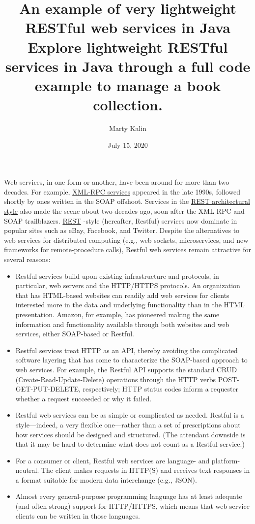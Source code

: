 \documentclass[12pt]{article}
\title{%
    An example of very lightweight RESTful web services in Java
    \large Explore lightweight RESTful services in Java through a full code example to manage a book collection.}
\author{Marty Kalin}
\date{July 15, 2020}
\begin{document}
\maketitle

\newpage

Web services, in one form or another, have been around for more than two decades. For example, \href{http://xmlrpc.com/}{XML-RPC services} appeared in the late 1990s, followed shortly by ones written in the SOAP offshoot. Services in the \href{https://en.wikipedia.org/wiki/Representational_state_transfer}{REST architectural style} also made the scene about two decades ago, soon after the XML-RPC and SOAP trailblazers. \href{https://www.redhat.com/en/topics/integration/whats-the-difference-between-soap-rest}{REST} -style (hereafter, Restful) services now dominate in popular sites such as eBay, Facebook, and Twitter. Despite the alternatives to web services for distributed computing (e.g., web sockets, microservices, and new frameworks for remote-procedure calls), Restful web services remain attractive for several reasons:\\

\begin{itemize}
    \item Restful services build upon existing infrastructure and protocols, in particular, web servers and the HTTP/HTTPS protocols. An organization that has HTML-based websites can readily add web services for clients interested more in the data and underlying functionality than in the HTML presentation. Amazon, for example, has pioneered making the same information and functionality available through both websites and web services, either SOAP-based or Restful.
    \item Restful services treat HTTP as an API, thereby avoiding the complicated software layering that has come to characterize the SOAP-based approach to web services. For example, the Restful API supports the standard CRUD (Create-Read-Update-Delete) operations through the HTTP verbs POST-GET-PUT-DELETE, respectively; HTTP status codes inform a requester whether a request succeeded or why it failed.
    \item Restful web services can be as simple or complicated as needed. Restful is a style—indeed, a very flexible one—rather than a set of prescriptions about how services should be designed and structured. (The attendant downside is that it may be hard to determine what does not count as a Restful service.)
    \item For a consumer or client, Restful web services are language- and platform-neutral. The client makes requests in HTTP(S) and receives text responses in a format suitable for modern data interchange (e.g., JSON).
    \item Almost every general-purpose programming language has at least adequate (and often strong) support for HTTP/HTTPS, which means that web-service clients can be written in those languages.
\end{itemize}
\end{document}
